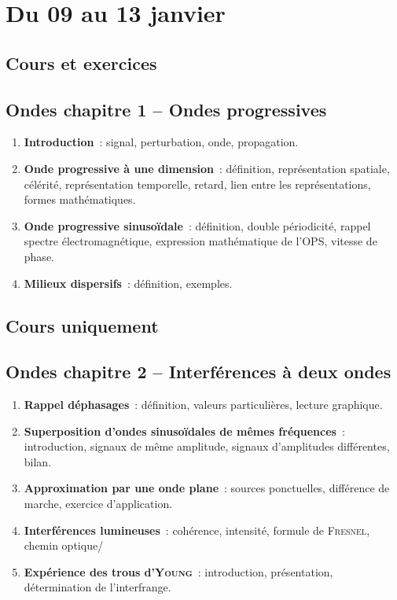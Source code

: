 \documentclass[a4paper, 12pt, final, garamond]{book}
\begin{document}
\setcounter{chapter}{13}

\chapter{Du 09 au 13 janvier}

\section{Cours et exercices}
\section*{Ondes chapitre 1 -- Ondes progressives}
\begin{enumerate}[label=\Roman*]
    \item \textbf{Introduction}~: signal, perturbation, onde, propagation.
    \item \textbf{Onde progressive à une dimension}~: définition, représentation
        spatiale, célérité, représentation temporelle, retard, lien entre les
        représentations, formes mathématiques.
    \item \textbf{Onde progressive sinusoïdale}~: définition, double
        périodicité, rappel spectre électromagnétique, expression mathématique
        de l'OPS, vitesse de phase.
    \item \textbf{Milieux dispersifs}~: définition, exemples.
\end{enumerate}

\section{Cours uniquement}

\section*{Ondes chapitre 2 -- Interférences à deux ondes}
\begin{enumerate}[label=\Roman*]
    \item \textbf{Rappel déphasages}~: définition, valeurs particulières,
        lecture graphique.
    \item \textbf{Superposition d'ondes sinusoïdales de mêmes fréquences}~:
        introduction, signaux de même amplitude, signaux d'amplitudes
        différentes, bilan.
    \item \textbf{Approximation par une onde plane}~: sources ponctuelles,
        différence de marche, exercice d'application.
    \item \textbf{Interférences lumineuses}~: cohérence, intensité, formule de
        \textsc{Fresnel}, chemin optique/
    \item \textbf{Expérience des trous d'\textsc{Young}}~: introduction,
        présentation, détermination de l'interfrange.
\end{enumerate}
\end{document}
